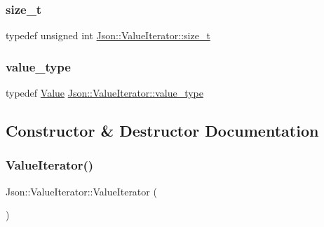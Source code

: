 \subsubsection{\texorpdfstring{size\+\_\+t}{size\_t}}
{\footnotesize\ttfamily typedef unsigned int \hyperlink{classJson_1_1ValueIterator_a308b8932ffc83eaa9d12dadd5c11a7dd_a308b8932ffc83eaa9d12dadd5c11a7dd}{Json\+::\+Value\+Iterator\+::size\+\_\+t}}

\mbox{\label{classJson_1_1ValueIterator_a2c5ba7be611f05546530c8a88b2d2e37_a2c5ba7be611f05546530c8a88b2d2e37}} 
\subsubsection{\texorpdfstring{value\+\_\+type}{value\_type}}
{\footnotesize\ttfamily typedef \hyperlink{classJson_1_1Value}{Value} \hyperlink{classJson_1_1ValueIterator_a2c5ba7be611f05546530c8a88b2d2e37_a2c5ba7be611f05546530c8a88b2d2e37}{Json\+::\+Value\+Iterator\+::value\+\_\+type}}



\subsection{Constructor \& Destructor Documentation}
\mbox{\label{classJson_1_1ValueIterator_a09425cf4dc12244072a942f290a5c0ec_a09425cf4dc12244072a942f290a5c0ec}} 
\subsubsection{\texorpdfstring{Value\+Iterator()}{ValueIterator()}\hspace{0.1cm}{\footnotesize\ttfamily [1/4]}}
{\footnotesize\ttfamily Json\+::\+Value\+Iterator\+::\+Value\+Iterator (\begin{DoxyParamCaption}{ }\end{DoxyParamCaption})}

\mbox{\label{classJson_1_1ValueIterator_aa85aa208670891670392259efa0143bb_aa85aa208670891670392259efa0143bb}} 
